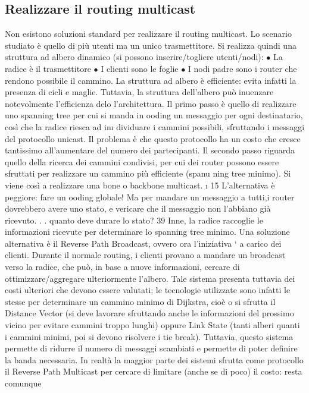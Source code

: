 \subsection{Realizzare il routing multicast}
Non esistono soluzioni standard per realizzare il routing multicast. Lo scenario
studiato è quello di più utenti ma un unico trasmettitore. Si realizza quindi una
struttura ad albero dinamico (si possono inserire/togliere utenti/nodi):
$\bullet$ La radice è il trasmettitore
$\bullet$ I clienti sono le foglie
$\bullet$ I nodi padre sono i router che rendono possibile il cammino.
La struttura ad albero è efficiente: evita infatti la presenza di cicli e maglie.
Tuttavia, la struttura dell'albero può inuenzare notevolmente l'efficienza delo
l'architettura.
Il primo passo è quello di realizzare uno spanning tree per cui si manda
in ooding un messaggio per ogni destinatario, così che la radice riesca ad in\i{}
dividuare i cammini possibili, sfruttando i messaggi del protocollo unicast. Il
problema è che questo protocollo ha un costo che cresce tantissimo all'aumentare
del numero dei partecipanti.
Il secondo passo riguarda quello della ricerca dei cammini condivisi, per cui
dei router possono essere sfruttati per realizzare un cammino più efficiente (spanu
ning tree minimo). Si viene così a realizzare una bone o backbone multicast.
\i{}
15 L'alternativa è peggiore: fare un ooding globale! Ma per mandare un messaggio a
tutti,i router dovrebbero avere uno stato, e vericare che il messaggio non l'abbiano già
ricevuto. . . quanto deve durare lo stato?
39
Inne, la radice raccoglie le informazioni ricevute per determinare lo spanning
tree minimo.
Una soluzione alternativa è il Reverse Path Broadcast, ovvero ora l'iniziativa
` a carico dei clienti. Durante il normale routing, i clienti provano a mandare
un broadcast verso la radice, che può, in base a nuove informazioni, cercare
di ottimizzare/aggregare ulteriormente l'albero. Tale sistema presenta tuttavia
dei costi ulteriori che devono essere valutati; le tecnologie utilizzate sono infatti
le stesse per determinare un cammino minimo di Dijkstra, cioè o si sfrutta il
Distance Vector (si deve lavorare sfruttando anche le informazioni del prossimo
vicino per evitare cammini troppo lunghi) oppure Link State (tanti alberi quanti
i cammini minimi, poi si devono risolvere i tie break). Tuttavia, questo sistema
permette di ridurre il numero di messaggi scambiati e permette di poter definire
la banda necessaria.
In realtà la maggior parte dei sistemi sfrutta come protocollo il Reverse Path
Multicast per cercare di limitare (anche se di poco) il costo: resta comunque
